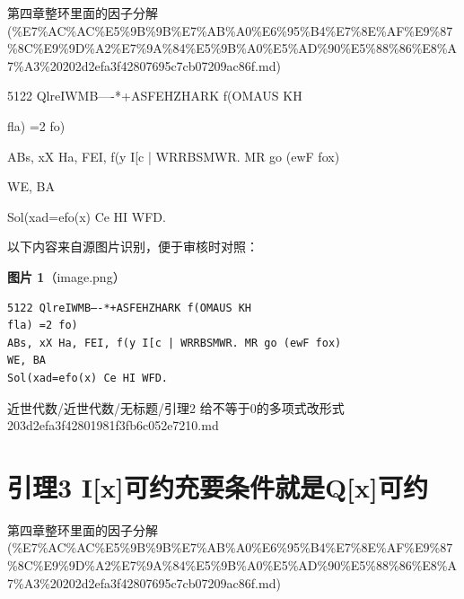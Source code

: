\begin{note}[来源上级主题]

第四章整环里面的因子分解 (\%E7\%AC\%AC\%E5\%9B\%9B\%E7\%AB\%A0\%E6\%95\%B4\%E7\%8E\%AF\%E9\%87\%8C\%E9\%9D\%A2\%E7\%9A\%84\%E5\%9B\%A0\%E5\%AD\%90\%E5\%88\%86\%E8\%A7\%A3\%20202d2efa3f42807695c7cb07209ac86f.md)

\end{note}

\begin{lemma}

5122 QlreIWMB—-*+ASFEHZHARK f(OMAUS KH

fla) =2 fo)

ABs, xX Ha, FEI, f(y I[c | WRRBSMWR. MR go (ewF fox)

WE, BA

Sol(xad=efo(x) Ce HI WFD.

\end{lemma}

\begin{note}
以下内容来自源图片识别，便于审核时对照：

\textbf{图片 1}（image.png）
\begin{Verbatim}[fontsize=\small]
5122 QlreIWMB—-*+ASFEHZHARK f(OMAUS KH
fla) =2 fo)
ABs, xX Ha, FEI, f(y I[c | WRRBSMWR. MR go (ewF fox)
WE, BA
Sol(xad=efo(x) Ce HI WFD.
\end{Verbatim}

\end{note}

\begin{note}[来源路径]

近世代数/近世代数/无标题/引理2 给不等于0的多项式改形式 203d2efa3f42801981f3fb6c052e7210.md

\end{note}

\section*{引理3 I[x]可约充要条件就是Q[x]可约}

\begin{note}[来源上级主题]

第四章整环里面的因子分解 (\%E7\%AC\%AC\%E5\%9B\%9B\%E7\%AB\%A0\%E6\%95\%B4\%E7\%8E\%AF\%E9\%87\%8C\%E9\%9D\%A2\%E7\%9A\%84\%E5\%9B\%A0\%E5\%AD\%90\%E5\%88\%86\%E8\%A7\%A3\%20202d2efa3f42807695c7cb07209ac86f.md)

\end{note}

